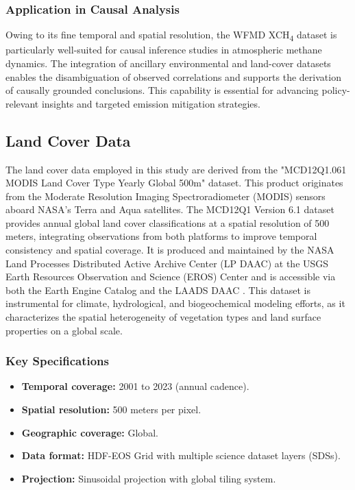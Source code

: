 \subsubsection{Application in Causal Analysis}
Owing to its fine temporal and spatial resolution, the WFMD XCH\textsubscript{4} dataset is particularly well-suited for causal inference studies in atmospheric methane dynamics. The integration of ancillary environmental and land-cover datasets enables the disambiguation of observed correlations and supports the derivation of causally grounded conclusions. This capability is essential for advancing policy-relevant insights and targeted emission mitigation strategies.

\subsection{Land Cover Data}
The land cover data employed in this study are derived from the "MCD12Q1.061 MODIS Land Cover Type Yearly Global 500m" dataset. This product originates from the Moderate Resolution Imaging Spectroradiometer (MODIS) sensors aboard NASA’s Terra and Aqua satellites. The MCD12Q1 Version 6.1 dataset provides annual global land cover classifications at a spatial resolution of 500 meters, integrating observations from both platforms to improve temporal consistency and spatial coverage. It is produced and maintained by the NASA Land Processes Distributed Active Archive Center (LP DAAC) at the USGS Earth Resources Observation and Science (EROS) Center and is accessible via both the Earth Engine Catalog \cite{modis_lc_ee} and the LAADS DAAC \cite{laads_daac}. This dataset is instrumental for climate, hydrological, and biogeochemical modeling efforts, as it characterizes the spatial heterogeneity of vegetation types and land surface properties on a global scale.

\subsubsection{Key Specifications}
\begin{itemize}
	\item \textbf{Temporal coverage:} 2001 to 2023 (annual cadence).
	\item \textbf{Spatial resolution:} 500 meters per pixel.
	\item \textbf{Geographic coverage:} Global.
	\item \textbf{Data format:} HDF-EOS Grid with multiple science dataset layers (SDSs).
	\item \textbf{Projection:} Sinusoidal projection with global tiling system.
\end{itemize}

